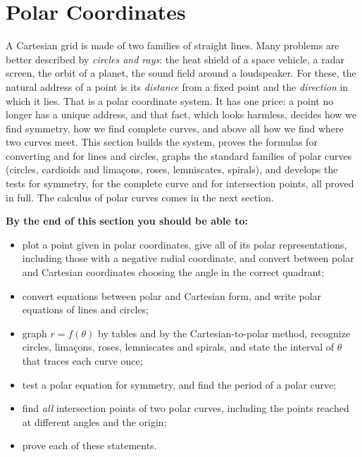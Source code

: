 \documentclass[11pt]{article}
\begin{document}
\section{Polar Coordinates}

\begin{guide}
A Cartesian grid is made of two families of straight lines. Many problems are better described by \emph{circles and rays}: the heat shield of a space vehicle, a radar screen, the orbit of a planet, the sound field around a loudspeaker. For these, the natural address of a point is its \emph{distance} from a fixed point and the \emph{direction} in which it lies. That is a polar coordinate system. It has one price: a point no longer has a unique address, and that fact, which looks harmless, decides how we find symmetry, how we find complete curves, and above all how we find where two curves meet. This section builds the system, proves the formulas for converting and for lines and circles, graphs the standard families of polar curves (circles, cardioids and limaçons, roses, lemniscates, spirals), and develops the tests for symmetry, for the complete curve and for intersection points, all proved in full. The calculus of polar curves comes in the next section.
\end{guide}

\textbf{By the end of this section you should be able to:}
\begin{itemize}
  \item plot a point given in polar coordinates, give all of its polar representations, including those with a negative radial coordinate, and convert between polar and Cartesian coordinates choosing the angle in the correct quadrant;
  \item convert equations between polar and Cartesian form, and write polar equations of lines and circles;
  \item graph $r=f(\theta)$ by tables and by the Cartesian-to-polar method, recognize circles, limaçons, roses, lemniscates and spirals, and state the interval of $\theta$ that traces each curve once;
  \item test a polar equation for symmetry, and find the period of a polar curve;
  \item find \emph{all} intersection points of two polar curves, including the points reached at different angles and the origin;
  \item prove each of these statements.
\end{itemize}

\end{document}
